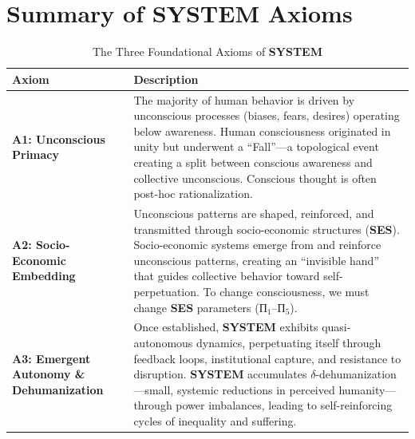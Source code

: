 \documentclass[11pt,a4paper]{article}
\newcommand{\SYSTEM}{\textbf{SYSTEM}}
\newcommand{\SES}{\textbf{SES}}
\newcommand{\deltaDehum}{$\delta$-dehumanization}
\theoremstyle{definition}
\theoremstyle{remark}
\begin{document}
\section{Summary of \SYSTEM{} Axioms}
\label{app:axioms}

\begin{table}[H]
\centering
\caption{The Three Foundational Axioms of \SYSTEM{}}
\label{tab:system_axioms}
\begin{tabular}{@{}p{}p{}@{}}
\toprule
\textbf{Axiom} & \textbf{Description} \\ \midrule
\textbf{A1: Unconscious Primacy} & The majority of human behavior is driven by unconscious processes (biases, fears, desires) operating below awareness. Human consciousness originated in unity but underwent a ``Fall''---a topological event creating a split between conscious awareness and collective unconscious. Conscious thought is often post-hoc rationalization. \\[0.3cm]
\textbf{A2: Socio-Economic Embedding} & Unconscious patterns are shaped, reinforced, and transmitted through socio-economic structures (\SES{}). Socio-economic systems emerge from and reinforce unconscious patterns, creating an ``invisible hand'' that guides collective behavior toward self-perpetuation. To change consciousness, we must change \SES{} parameters (П$_1$--П$_5$). \\[0.3cm]
\textbf{A3: Emergent Autonomy \& Dehumanization} & Once established, \SYSTEM{} exhibits quasi-autonomous dynamics, perpetuating itself through feedback loops, institutional capture, and resistance to disruption. \SYSTEM{} accumulates \deltaDehum{}---small, systemic reductions in perceived humanity---through power imbalances, leading to self-reinforcing cycles of inequality and suffering. \\ \bottomrule
\end{tabular}
\end{table}
\end{document}

